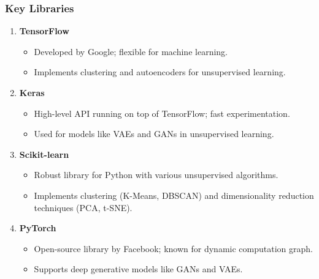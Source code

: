 \documentclass[aspectratio=169]{beamer}
\begin{document}
\begin{frame}[fragile]
    \frametitle{Key Libraries}
    
    \begin{enumerate}
        \item \textbf{TensorFlow}
        \begin{itemize}
            \item Developed by Google; flexible for machine learning.
            \item Implements clustering and autoencoders for unsupervised learning.
        \end{itemize}
        
        \item \textbf{Keras}
        \begin{itemize}
            \item High-level API running on top of TensorFlow; fast experimentation.
            \item Used for models like VAEs and GANs in unsupervised learning.
        \end{itemize}
        
        \item \textbf{Scikit-learn}
        \begin{itemize}
            \item Robust library for Python with various unsupervised algorithms.
            \item Implements clustering (K-Means, DBSCAN) and dimensionality reduction techniques (PCA, t-SNE).
        \end{itemize}
        
        \item \textbf{PyTorch}
        \begin{itemize}
            \item Open-source library by Facebook; known for dynamic computation graph.
            \item Supports deep generative models like GANs and VAEs.
        \end{itemize}
    \end{enumerate}
\end{frame}
\end{document}
